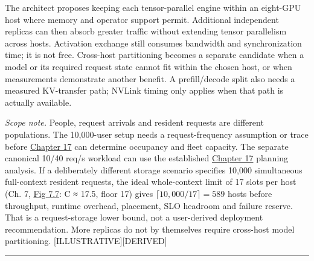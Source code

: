 The architect proposes keeping each tensor-parallel engine within an
eight-GPU host where memory and operator support permit. Additional
independent replicas can then absorb greater traffic without extending
tensor parallelism across hosts. Activation exchange still consumes
bandwidth and synchronization time; it is not free. Cross-host
partitioning becomes a separate candidate when a model or its required
request state cannot fit within the chosen host, or when measurements
demonstrate another benefit. A prefill/decode split also needs a
measured KV-transfer path; NVLink timing only applies when that path is
actually available.

\emph{Scope note.} People, request arrivals and resident requests are
different populations. The 10,000-user setup needs a request-frequency
assumption or trace before \hyperref[chap:17]{Chapter 17} can determine occupancy and fleet
capacity. The separate canonical 10/40 req/s workload can use the
established \hyperref[chap:17]{Chapter 17} planning analysis. If a deliberately different
storage scenario specifies 10,000 simultaneous full-context resident
requests, the ideal whole-context limit of 17 slots per host (Ch. 7, \hyperref[fig:7.7]{Fig 7.7}: C ≈ 17.5, floor 17) gives \(\lceil 10{,}000/17 \rceil=589\) hosts
before throughput, runtime overhead, placement, SLO headroom and failure
reserve. That is a request-storage lower bound, not a user-derived
deployment recommendation. More replicas do not by themselves require
cross-host model partitioning. \mbox{{[}ILLUSTRATIVE{]}}\hspace{0pt}\mbox{{[}DERIVED{]}}

\begin{center}\rule{0.5\linewidth}{0.5pt}\end{center}

